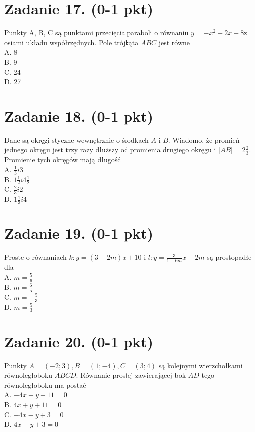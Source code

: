 \documentclass[10pt]{article}
\begin{document}
\section*{Zadanie 17. (0-1 pkt)}
Punkty A, B, C są punktami przecięcia paraboli o równaniu \(y=-x^{2}+2 x+8 \mathrm{z}\) osiami układu współrzędnych. Pole trójkąta \(A B C\) jest równe\\
A. 8\\
B. 9\\
C. 24\\
D. 27

\section*{Zadanie 18. (0-1 pkt)}
Dane są okręgi styczne wewnętrznie o środkach \(A\) i \(B\). Wiadomo, że promień jednego okręgu jest trzy razy dłuższy od promienia drugiego okręgu i \(|A B|=2 \frac{2}{3}\). Promienie tych okręgów mają długość\\
A. \(\frac{1}{3} i 3\)\\
B. \(1 \frac{1}{2} i 4 \frac{1}{2}\)\\
C. \(\frac{2}{3} i 2\)\\
D. \(1 \frac{1}{3} i 4\)

\section*{Zadanie 19. (0-1 pkt)}
Proste o równaniach \(k: y=(3-2 m) x+10\) i \(l: y=\frac{3}{1-6 m} x-2 m\) są prostopadłe dla\\
A. \(m=\frac{5}{6}\)\\
B. \(m=\frac{6}{5}\)\\
C. \(m=-\frac{5}{3}\)\\
D. \(m=\frac{5}{3}\)

\section*{Zadanie 20. (0-1 pkt)}
Punkty \(A=(-2 ; 3), B=(1 ;-4), C=(3 ; 4)\) są kolejnymi wierzchołkami równoległoboku \(A B C D\). Równanie prostej zawierającej bok \(A D\) tego równoległoboku ma postać\\
A. \(-4 x+y-11=0\)\\
B. \(4 x+y+11=0\)\\
C. \(-4 x-y+3=0\)\\
D. \(4 x-y+3=0\)
\end{document}
